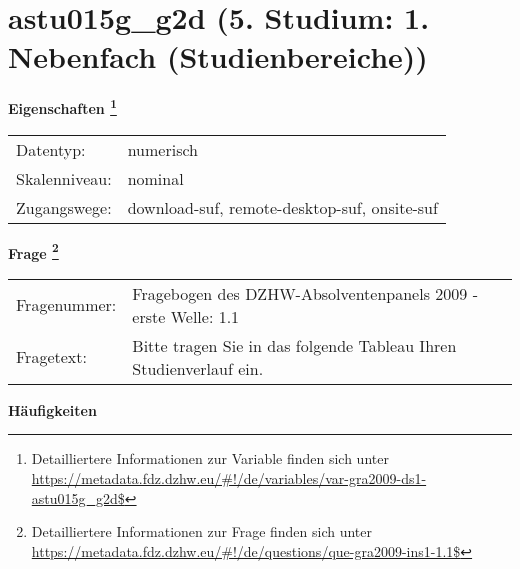 
    \setcounter{footnote}{0}

    \vspace*{-1.8cm}
	\section{astu015g\_g2d (5. Studium: 1. Nebenfach (Studienbereiche))}
	\label{section:astu015g_g2d}



    \vspace*{0.5cm}
    \noindent\textbf{Eigenschaften
	\footnote{Detailliertere Informationen zur Variable finden sich unter
		\url{https://metadata.fdz.dzhw.eu/\#!/de/variables/var-gra2009-ds1-astu015g_g2d$}}}\\
	\begin{tabularx}{\hsize}{@{}lX}
	Datentyp: & numerisch \\
	Skalenniveau: & nominal \\
	Zugangswege: &
	  download-suf, 
	  remote-desktop-suf, 
	  onsite-suf
 \\
    \end{tabularx}



				\vspace*{0.5cm}
                \noindent\textbf{Frage
	                \footnote{Detailliertere Informationen zur Frage finden sich unter
		              \url{https://metadata.fdz.dzhw.eu/\#!/de/questions/que-gra2009-ins1-1.1$}}}\\
				\begin{tabularx}{\hsize}{@{}lX}
					Fragenummer: &
					  Fragebogen des DZHW-Absolventenpanels 2009 - erste Welle:
					  1.1
 \\
					Fragetext: & Bitte tragen Sie in das folgende Tableau Ihren Studienverlauf ein. \\
				\end{tabularx}





        		\vspace*{0.5cm}
                \noindent\textbf{Häufigkeiten}

